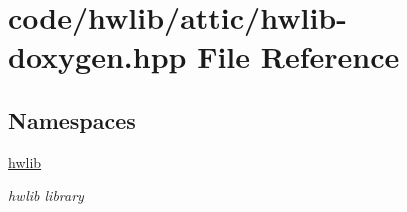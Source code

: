 \hypertarget{hwlib-doxygen_8hpp}{}\section{code/hwlib/attic/hwlib-\/doxygen.hpp File Reference}
\label{hwlib-doxygen_8hpp}
\subsection*{Namespaces}
\begin{DoxyCompactItemize}
\item 
 \hyperlink{namespacehwlib}{hwlib}
\begin{DoxyCompactList}\small\item\em hwlib library \end{DoxyCompactList}\end{DoxyCompactItemize}
